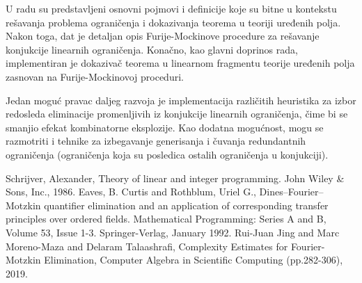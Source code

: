 \documentclass[a4paper,10pt]{article}
\begin{document}
U radu su predstavljeni osnovni pojmovi i definicije koje su bitne u kontekstu rešavanja problema ograničenja i dokazivanja teorema u teoriji uređenih polja. Nakon toga, dat je detaljan opis Furije-Mockinove procedure za rešavanje konjukcije linearnih ograničenja. Konačno, kao glavni doprinos rada, implementiran je dokazivač teorema u linearnom fragmentu teorije uređenih polja zasnovan na Furije-Mockinovoj proceduri.

Jedan moguć pravac daljeg razvoja je implementacija različitih heuristika za izbor redosleda eliminacije promenljivih iz konjukcije linearnih ograničenja, čime bi se smanjio efekat kombinatorne eksplozije. Kao dodatna mogućnost, mogu se razmotriti i tehnike za izbegavanje generisanja i čuvanja redundantnih ograničenja (ograničenja koja su posledica ostalih ograničenja u konjukciji).

\begin{thebibliography}{100}
 Schrijver, Alexander, Theory of linear and integer programming. John Wiley \& Sons, Inc., 1986.
 Eaves, B. Curtis and Rothblum, Uriel G., Dines--Fourier--Motzkin quantifier elimination and an application of corresponding transfer principles over ordered fields. Mathematical Programming: Series A and B, Volume 53, Issue 1-3. Springer-Verlag, January 1992.
 Rui-Juan Jing and Marc Moreno-Maza and Delaram Talaashrafi, Complexity Estimates for Fourier-Motzkin Elimination, Computer Algebra in Scientific Computing (pp.282-306), 2019.
\end{thebibliography}
\end{document}
